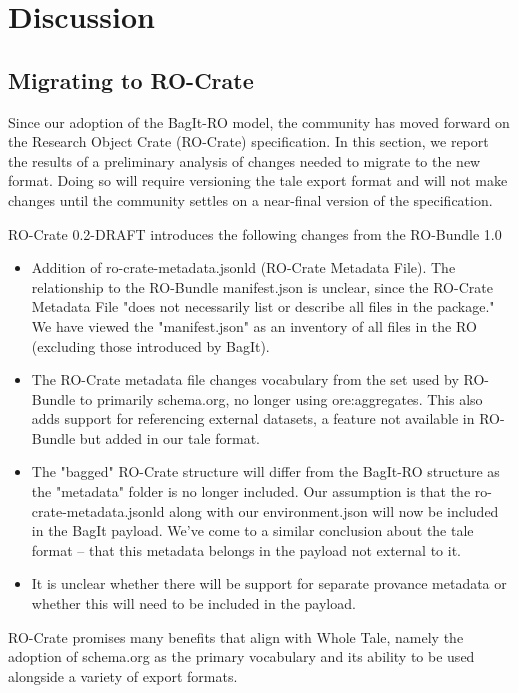 \documentclass[conference]{IEEEtran}
\begin{document}
\section{Discussion}

\subsection{Migrating to RO-Crate}
Since our adoption of the BagIt-RO model, the community has moved forward on the Research Object 
Crate (RO-Crate) specification. In this section, we report the results of a preliminary analysis 
of changes needed to migrate to the new format.  Doing so will require versioning the tale export 
format and will not make changes until the community settles on a near-final version of the 
specification.

RO-Crate 0.2-DRAFT introduces the following changes from the RO-Bundle 1.0
\begin{itemize}
\item{Addition of ro-crate-metadata.jsonld (RO-Crate Metadata File). The relationship to the RO-Bundle manifest.json is unclear, since the RO-Crate Metadata File "does not necessarily list or describe all files in the package." We have viewed the "manifest.json" as an inventory of all files in the RO (excluding those introduced by BagIt).}
\item{The RO-Crate metadata file changes vocabulary from the set used by RO-Bundle to primarily schema.org, no longer using ore:aggregates. This also adds support for referencing external datasets, a feature not available in RO-Bundle but added in our tale format.}
\item{The "bagged" RO-Crate structure will differ from the BagIt-RO structure as the "metadata" folder is no longer included.  Our assumption is that the ro-crate-metadata.jsonld along with our environment.json will now be included in the BagIt payload. We've come to a similar conclusion about the tale format -- that this metadata belongs in the payload not external to it.}
\item{It is unclear whether there will be support for separate provance metadata or whether this will need to be included in the payload.}
\end{itemize}

RO-Crate promises many benefits that align with Whole Tale, namely the adoption of schema.org as the primary vocabulary and its ability to be used alongside a variety of export formats. 
\end{document}
